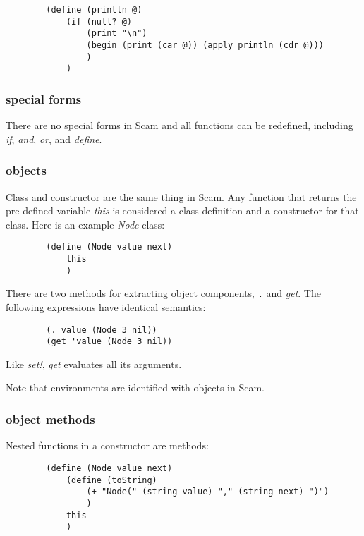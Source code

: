 \documentclass{article}
\begin{document}
\begin{verbatim}
        (define (println @)
            (if (null? @)
                (print "\n")
                (begin (print (car @)) (apply println (cdr @)))
                )
            )
\end{verbatim}

\subsubsection*{special forms}

    There are no special forms in Scam and all functions can be
    redefined, including {\it if}, {\it and}, {\it or}, and {\it define}.

\subsubsection*{objects}

    Class and constructor are the same thing in Scam. Any function that
    returns the pre-defined variable {\it this} is considered a class
    definition and a constructor for that class. Here is an example
    {\it Node} class:

\begin{verbatim}
        (define (Node value next)
            this
            )
\end{verbatim}

    There are two methods for extracting object components, \verb!.! and
    {\it get}. The following expressions have identical semantics:

\begin{verbatim}
        (. value (Node 3 nil))
        (get 'value (Node 3 nil))
\end{verbatim}

    Like {\it set!}, {\it get} evaluates all its arguments.

    Note that environments are identified with objects in Scam.

\subsubsection*{object methods}

    Nested functions in a constructor are methods:

\begin{verbatim}
        (define (Node value next)
            (define (toString)
                (+ "Node(" (string value) "," (string next) ")")
                )
            this
            )
\end{verbatim}
\end{document}

